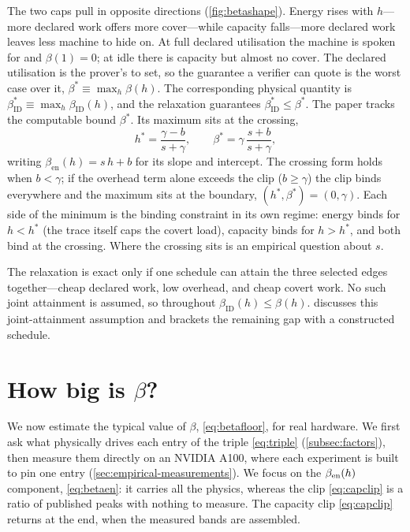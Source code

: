 \documentclass{article}
\theoremstyle{plain}
\theoremstyle{definition}
\theoremstyle{remark}
\begin{document}
The two caps pull in opposite directions (\cref{fig:betashape}). Energy
rises with $h$---more declared work offers more cover---while capacity
falls---more
declared work leaves less machine to hide on. At full declared utilisation
the machine is spoken for and $\beta(1) = 0$; at idle there
is capacity but almost no cover. The declared utilisation is the prover's to
set, so the guarantee a verifier can quote is the worst case over it,
$\beta^{*} \equiv \max_h \beta(h)$. The corresponding physical quantity is
$\beta_{\mathrm{ID}}^{*} \equiv \max_h \beta_{\mathrm{ID}}(h)$, and the
relaxation guarantees $\beta_{\mathrm{ID}}^{*} \leq \beta^{*}$.
The paper tracks the computable bound $\beta^{*}$. Its maximum sits at the crossing,
\begin{equation}
	h^{*} = \frac{\gamma - b}{s + \gamma}, \qquad
	\beta^{*} = \gamma\,\frac{s + b}{s + \gamma},
	\label{eq:betaworst}
\end{equation}
writing $\beta_{\mathrm{en}}(h) = s\,h + b$ for its slope and intercept. The crossing form
holds when $b < \gamma$; if the overhead term alone exceeds the clip
($b \ge \gamma$) the clip binds everywhere and the maximum sits at the
boundary, $(h^{*}, \beta^{*}) = (0, \gamma)$. Each side of the
minimum is the binding constraint in its own regime: energy binds for
$h < h^{*}$ (the trace itself caps the covert load), capacity binds for
$h > h^{*}$, and both bind at the crossing. Where the crossing sits is an
empirical question about $s$.

The relaxation is exact only if one schedule can attain the three selected
edges together---cheap declared work, low overhead, and cheap covert work.
No such joint attainment is assumed, so throughout
$\beta_{\mathrm{ID}}(h) \leq \beta(h)$.  discusses this
joint-attainment assumption and brackets the remaining gap with a constructed schedule.

\section{How big is \texorpdfstring{$\beta$}{beta}?}
\label{sec:howbig}

We now estimate the typical value of $\beta$, \cref{eq:betafloor}, for real hardware. We first ask what physically drives each entry of the triple \cref{eq:triple}
(\cref{subsec:factors}), then measure them directly on an NVIDIA A100, where
each experiment is built to pin one entry
(\cref{sec:empirical-measurements}). We focus on the $\beta_{\rm en}(h)$ component, \cref{eq:betaen}: it carries all
the physics, whereas the clip \cref{eq:capclip} is a ratio of published peaks
with nothing to measure. The capacity clip \cref{eq:capclip}
returns at the end, when the measured bands are assembled.
\end{document}
